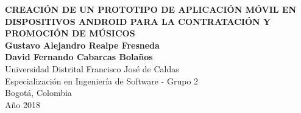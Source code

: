 \begin{center}
\begin{figure}
\centering%
%
\end{figure}
\thispagestyle{empty} \vspace*{0.5cm} \textbf{ \LARGE
CREACIÓN DE UN PROTOTIPO DE APLICACIÓN MÓVIL EN 
DISPOSITIVOS ANDROID PARA LA CONTRATACIÓN Y PROMOCIÓN DE MÚSICOS 
}\\[3.5cm]
\Large\textbf{Gustavo Alejandro Realpe Fresneda}\\
\Large\textbf{David Fernando Cabarcas Bolaños}\\[4.5cm]
\small Universidad Distrital Francisco Jos\'{e} de Caldas\\
Especialización en Ingeniería de Software - Grupo 2 \\
Bogotá, Colombia\\
A\~{n}o 2018\\
\end{center}
